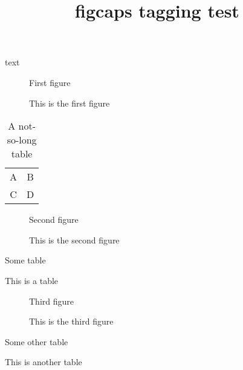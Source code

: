 \documentclass{article}
\title{figcaps tagging test}
\begin{document}
text
\begin{figure}\centering
First figure
\caption{This is the first figure}
\end{figure}
\begin{longtable}{cc}
\caption{A not-so-long table}\\
A & B \\
C & D
\end{longtable}
\begin{figure}\centering
Second figure
\caption{This is the second figure}
\end{figure}
\begin{table}\centering
Some table
\caption{This is a table}
\end{table}
\begin{figure}\centering
Third figure
\caption{This is the third figure}
\end{figure}
\begin{table}\centering
Some other table
\caption{This is another table}
\end{table}
\end{document}

